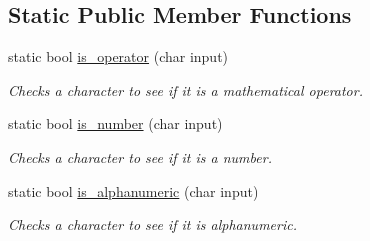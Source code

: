 \subsection*{Static Public Member Functions}
\begin{DoxyCompactItemize}
\item 
static bool \hyperlink{classMadara_1_1Expression__Tree_1_1Interpreter_a79a4c598935d50056cda3a3cd9b94a5b}{is\_\-operator} (char input)
\begin{DoxyCompactList}\small\item\em Checks a character to see if it is a mathematical operator. \item\end{DoxyCompactList}\item 
static bool \hyperlink{classMadara_1_1Expression__Tree_1_1Interpreter_a2431f81424243eac15e207f12c2eb7ab}{is\_\-number} (char input)
\begin{DoxyCompactList}\small\item\em Checks a character to see if it is a number. \item\end{DoxyCompactList}\item 
static bool \hyperlink{classMadara_1_1Expression__Tree_1_1Interpreter_a224dd7649825732d5da675bcf66f5309}{is\_\-alphanumeric} (char input)
\begin{DoxyCompactList}\small\item\em Checks a character to see if it is alphanumeric. \item\end{DoxyCompactList}\end{DoxyCompactItemize}
